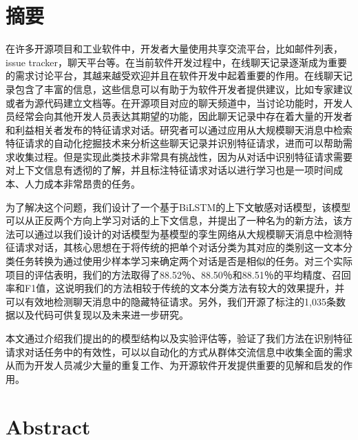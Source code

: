 \maketitle%
\MAKETITLE%
\makedeclaration%
\intobmk\chapter*{摘\quad 要}%
\setcounter{page}{1}%

在许多开源项目和工业软件中，开发者大量使用共享交流平台，比如邮件列表，issue tracker，聊天平台等。在当前软件开发过程中，在线聊天记录逐渐成为重要的需求讨论平台，其越来越受欢迎并且在软件开发中起着重要的作用。在线聊天记录包含了丰富的信息，这些信息可以有助于为软件开发者提供建议，比如专家建议或者为源代码建立文档等。在开源项目对应的聊天频道中，当讨论功能时，开发人员经常会向其他开发人员表达其期望的功能，因此聊天记录中存在着大量的开发者和利益相关者发布的特征请求对话。研究者可以通过应用从大规模聊天消息中检索特征请求的自动化挖掘技术来分析这些聊天记录并识别特征请求，进而可以帮助需求收集过程。但是实现此类技术非常具有挑战性，因为从对话中识别特征请求需要对上下文信息有透彻的了解，并且标注特征请求对话以进行学习也是一项时间成本、人力成本非常昂贵的任务。


为了解决这个问题，我们设计了一个基于BiLSTM的上下文敏感对话模型，该模型可以从正反两个方向上学习对话的上下文信息，并提出了一种名为{\tool}的新方法，该方法可以通过以我们设计的对话模型为基模型的孪生网络从大规模聊天消息中检测特征请求对话，其核心思想在于将传统的把单个对话分类为其对应的类别这一文本分类任务转换为通过使用少样本学习来确定两个对话是否是相似的任务。对三个实际项目的评估表明，我们的方法取得了88.52％、88.50％和88.51％的平均精度、召回率和F1值，这说明我们的方法相较于传统的文本分类方法有较大的效果提升，并可以有效地检测聊天消息中的隐藏特征请求。另外，我们开源了标注的1,035条数据以及代码可供复现以及未来进一步研究。

本文通过介绍我们提出的{\tool}的模型结构以及实验评估等，验证了我们方法在识别特征请求对话任务中的有效性，可以以自动化的方式从群体交流信息中收集全面的需求从而为开发人员减少大量的重复工作、为开源软件开发提供重要的见解和启发的作用。


\intobmk\chapter*{Abstract}%


